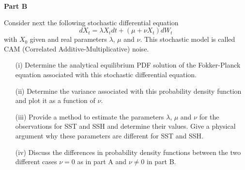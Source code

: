 \documentclass[11pt, oneside]{article}   	%
\begin{document}
\newpage 

\centerline{{\bf Part B}}  

Consider next the following stochastic differential equation 
%
\[
dX_t = \lambda X_t dt + (\mu + \nu X_t)  dW_t
\]
%
with $X_0$ given and real parameters $\lambda$, $\mu$
and $\nu$. This stochastic model is called CAM (Correlated  
Additive-Multiplicative) noise. 

\begin{itemize}

\item[(i)]  Determine the analytical equilibrium PDF solution  
of the Fokker-Planck  equation associated with this stochastic 
differential equation. 

\item[(ii)]  Determine the variance  associated with this  
probability density function and plot it as a function 
of $\nu$. 

\item[(iii)] Provide a method to estimate the parameters $\lambda$, 
$\mu$ and $\nu$ for the observations for SST and SSH and  determine 
their values. Give a physical argument why these  parameters are 
different for SST and SSH.  

\item[(iv)] 
Discuss the differences in probability density functions between 
the two different cases  $\nu = 0$ as in part A and $\nu \neq 0$ 
in part B.  

\end{itemize}
\end{document}
